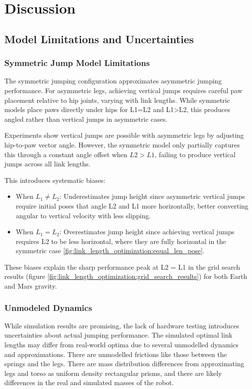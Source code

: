 \section{Discussion}

\subsection{Model Limitations and Uncertainties}

\subsubsection{Symmetric Jump Model Limitations}
The symmetric jumping configuration approximates asymmetric jumping performance. For asymmetric legs, achieving vertical jumps requires careful paw placement relative to hip joints, varying with link lengths. While symmetric models place paws directly under hips for L1=L2 and L1>L2, this produces angled rather than vertical jumps in asymmetric cases.

Experiments show vertical jumps are possible with asymmetric legs by adjusting hip-to-paw vector angle. However, the symmetric model only partially captures this through a constant angle offset when $L2 > L1$, failing to produce vertical jumps across all link lengths.

This introduces systematic biases:
\begin{itemize}
    \item When \(L_1 \neq L_2\): Underestimates jump height since asymmetric vertical jumps require initial poses that angle L2 and L1 more horizontally, better converting angular to vertical velocity with less slipping.
    \item When \(L_1 = L_2\): Overestimates jump height since achieving vertical jumps requires L2 to be less horizontal, where they are fully horizontal in the symmetric case \ref{fig:link_length_optimization:equal_len_pose}.
\end{itemize}

These biases explain the sharp performance peak at L2 = L1 in the grid search results (figure \ref{fig:link_length_optimization:grid_search_results}) for both Earth and Mars gravity.

\subsubsection{Unmodeled Dynamics}
While simulation results are promising, the lack of hardware testing introduces uncertainties about actual jumping performance. The 
simulated optimal link lengths may differ from real-world optima due to several unmodelled dynamics and approximations. There are 
unmodelled frictions like those between the springs and the legs. There are mass distribution differences from approximating legs and 
torso as uniform density rectangular prisms, and there are likely differences in the real and simulated masses of the robot.

